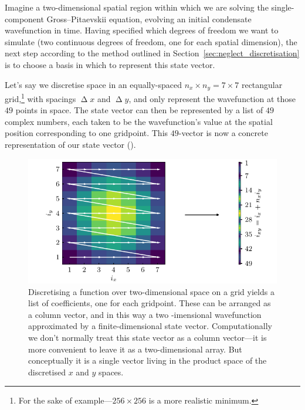 Imagine a two-dimensional spatial region within which we are solving the single-component Gross--Pitaevskii equation, evolving an initial condensate wavefunction in time. Having specified which degrees of freedom we want to simulate (two continuous degrees of freedom, one for each spatial dimension), the next step according to the method outlined in Section~\ref{sec:neglect_discretisation} is to choose a basis in which to represent this state vector.

Let's say we discretise space in an equally-spaced $n_x\times n_y = 7\times 7$ rectangular grid,\footnote{For the sake of example---$256\times256$ is a more realistic minimum.} with spacings $\upDelta x$ and $\upDelta y$, and only represent the wavefunction at those $49$ points in space. The state vector can then be represented by a list of $49$ complex numbers, each taken to be the wavefunction's value at the spatial position corresponding to one gridpoint. This $49$-vector is now a concrete representation of our state vector ().

\begin{figure}[t]
    \centerfloat
    \includegraphics[width=\textwidth]{figures/numerics/vector_unravel.pdf}
    \caption{Discretising a function over two-dimensional space on a grid yields a list of coefficients, one for each gridpoint. These can be arranged as a column vector, and in this way a two -imensional wavefunction approximated by a finite-dimensional state vector. Computationally we don't normally treat this state vector as a column vector---it is more convenient to leave it as a two-dimensional array. But conceptually it is a single vector living in the product space of the discretised $x$ and $y$ spaces.}
    \label{fig:vector_unravel}
\end{figure}

